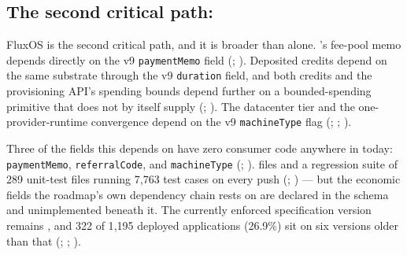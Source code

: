 \subsection{The second critical path: }\label{sec:26-v9}

FluxOS  is the second critical path, and it is broader than \PNR alone. \PNR's fee-pool
memo depends directly on the v9 \texttt{paymentMemo} field (\planned; ).
Deposited credits depend on the same substrate through the v9 \texttt{duration} field, and both
credits and the provisioning API's spending bounds depend further on a bounded-spending primitive
that  does not by itself supply (\planned; ). The
datacenter tier and the one-provider-runtime convergence depend on the v9 \texttt{machineType} flag
(\planned; ; ).

Three of the fields this depends on have zero consumer code anywhere in \FluxOS today:
\texttt{paymentMemo}, \texttt{referralCode}, and \texttt{machineType} (\inprogress;
). 
files and a regression suite of 289 unit-test files running 7,763 test cases on every push
(\inprogress; ) — but the economic fields the roadmap's own dependency
chain rests on are declared in the schema and unimplemented beneath it. The currently enforced
specification version remains , and 322 of 1{,}195 deployed applications (26.9\%) sit on
six versions older than that (\inprogress; ; ).


